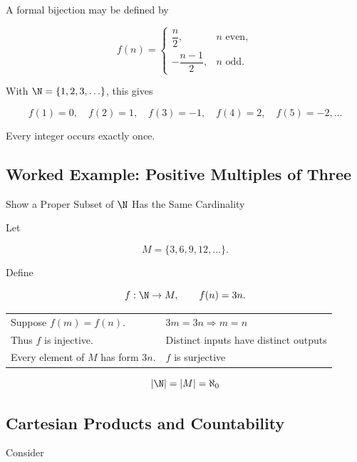 A formal bijection may be defined by

\[ f(n)=
\begin{cases}
\dfrac n2,&n\text{ even},\\[4pt]
-\dfrac{n-1}{2},&n\text{ odd}.
\end{cases} \]

With \(\N=\{1,2,3,\ldots\}\), this gives

\[ f(1)=0,\quad f(2)=1,\quad f(3)=-1,\quad f(4)=2,\quad f(5)=-2,\ldots \]

Every integer occurs exactly once.

\subsection{Worked Example: Positive Multiples of Three}
\label{subsec:worked-multiples-three}

\begin{workedexamplebox}{Show a Proper Subset of \(\N\) Has the Same Cardinality}

Let

\[ M=\{3,6,9,12,\ldots\}. \]

Define

\[ f:\N\to M,\qquad f(n)=3n. \]

\begin{tabularx}{\textwidth}{@{}>{\raggedright\arraybackslash}p{}X@{}}
Suppose \(f(m)=f(n)\). & \(3m=3n\Rightarrow m=n\)\\
Thus \(f\) is injective. & Distinct inputs have distinct outputs\\
Every element of \(M\) has form \(3n\). & \(f\) is surjective
\end{tabularx}

\begin{answerbox}
\[ |\N|=|M|=\aleph_0 \]
\end{answerbox}
\end{workedexamplebox}

\subsection{Cartesian Products and Countability}
\label{subsec:cartesian-countability}

Consider

